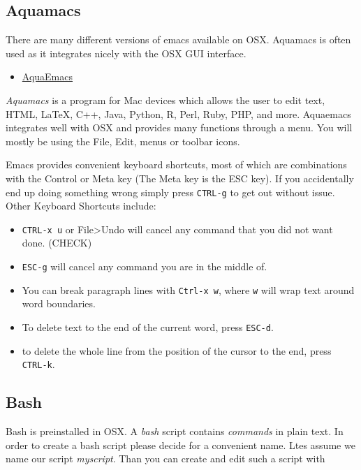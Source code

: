 \subsection{Aquamacs}\label{aquamacs}

There are many different versions of emacs available on OSX. Aquamacs is
often used as it integrates nicely with the OSX GUI interface.

\begin{itemize}
\tightlist
\item
  \href{http://aquamacs.org/download.shtml}{AquaEmacs}
\end{itemize}

\emph{Aquamacs} is a program for Mac devices which allows the user to
edit text, HTML, LaTeX, C++, Java, Python, R, Perl, Ruby, PHP, and more.
Aquaemacs integrates well with OSX and provides many functions through a
menu. You will mostly be using the File, Edit, menus or toolbar icons.

Emacs provides convenient keyboard shortcuts, most of which are
combinations with the Control or Meta key (The Meta key is the ESC key).
If you accidentally end up doing something wrong simply press
\texttt{CTRL-g} to get out without issue. Other Keyboard Shortcuts
include:

\begin{itemize}
\item
  \texttt{CTRL-x\ u} or File\textgreater{}Undo will cancel any command
  that you did not want done. (CHECK)
\item
  \texttt{ESC-g} will cancel any command you are in the middle of.
\item
  You can break paragraph lines with \texttt{Ctrl-x\ w}, where
  \texttt{w} will wrap text around word boundaries.
\item
  To delete text to the end of the current word, press \texttt{ESC-d}.
\item
  to delete the whole line from the position of the cursor to the end,
  press \texttt{CTRL-k}.
\end{itemize}

\subsection{Bash}\label{bash}

Bash is preinstalled in OSX. A \emph{bash} script contains
\emph{commands} in plain text. In order to create a bash script please
decide for a convenient name. Ltes assume we name our script
\emph{myscript}. Than you can create and edit such a script with

